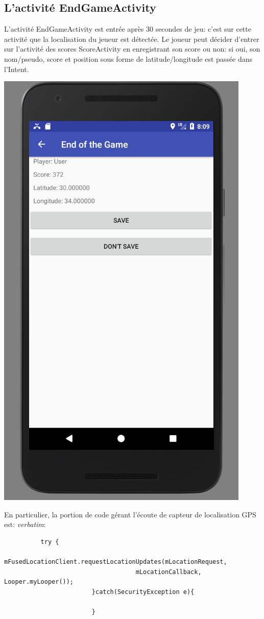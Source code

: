 \documentclass{article}
\begin{document}
\subsection{L'activité EndGameActivity}
L'activité EndGameActivity est entrée après 30 secondes de jeu: c'est sur cette activité que la localisation du jeueur est détectée. Le joueur peut décider d'entrer sur l'activité des scores ScoreActivity en enregistrant son score ou non: si oui, son nom/pseudo, score et position sous forme de latitude/longitude est passée dans l'Intent.
\begin{center}
  \includegraphics[scale=0.5]{EndGameActivity.png}
\end{center}
En particulier, la portion de code gérant l'écoute de capteur de localisation GPS est:
\textit{verbatim}:
\begin{verbatim}
		  try {
                            mFusedLocationClient.requestLocationUpdates(mLocationRequest,
                                    mLocationCallback, Looper.myLooper());
                        }catch(SecurityException e){

                        }
\end{verbatim}
\end{document}
